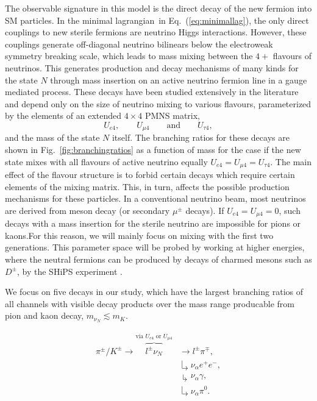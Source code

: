 \documentclass[11pt, a4paper]{article}
\newcommand{\refeq}[1]{Eq.~(\ref{#1})}
\newcommand{\reffig}[1]{Fig.~\ref{#1}}
\def\lagrangian{lagrangian}
\begin{document}
The observable signature in this model is the direct decay of the new fermion
into SM particles. In the minimal \lagrangian\ in \refeq{eq:minimallag}, the
only direct couplings to new sterile fermions are neutrino Higgs interactions.
However, these couplings generate off-diagonal neutrino bilinears below the
electroweak symmetry breaking scale, which leads to mass mixing between the
$4+$ flavours of neutrinos. This generates production and decay mechanisms of
many kinds for the state $N$ through mass insertion on an active neutrino
fermion line in a gauge mediated process. These decays have been studied
extensively in the literature \cite{Atre:2009rg} and depend only on the size of
neutrino mixing to various flavours, parameterized by the elements of an
extended $4\times4$ PMNS matrix,
%
\[ U_{e4}, \qquad U_{\mu 4} \qquad \text{and} \qquad U_{\tau 4},  \]
%
and the mass of the state $N$ itself. The branching ratios for these decays are
shown in \reffig{fig:branchingratios} as a function of mass for the case if the
new state mixes with all flavours of active neutrino equally $U_{e4}=U_{\mu
4}=U_{\tau 4}$. The main effect of the flavour structure is to
forbid certain decays which require certain elements of the mixing matrix. This, in turn, affects the possible production
mechanisms for these particles. In a conventional neutrino beam, most neutrinos
are derived from meson decay (or secondary $\mu^\pm$ decays). If $U_{e4}=U_{\mu
4}=0$, such decays with a mass insertion for the sterile neutrino are
impossible for pions or kaons.For this reason, we will mainly focus on mixing with the first two generations. This parameter space will be probed by working
at higher energies, where the neutral fermions can be produced by decays of
charmed mesons such as $D^\pm$, by the SHiPS experiment \cite{Alekhin:2015byh, Anelli:2015pba}.   

We focus on five decays in our study, which have the largest branching ratios
of all channels with visible decay products over the mass range producable from pion and kaon decay, $m_{\nu_N} \lesssim m_K$.

\begin{align*}
	\pi^\pm / K^\pm \longrightarrow \overbrace{l^\pm \nu_N}^{\text{via } U_{e4} \text{ or } U_{\mu 4}}  &\longrightarrow  l^\pm \pi^\mp, \\
						& \drsh \nu_\alpha e^+ e^-, \\
						& \drsh \nu_\alpha \gamma, \\
						& \drsh \nu_\alpha \pi^0. \\
\end{align*}
\end{document}
